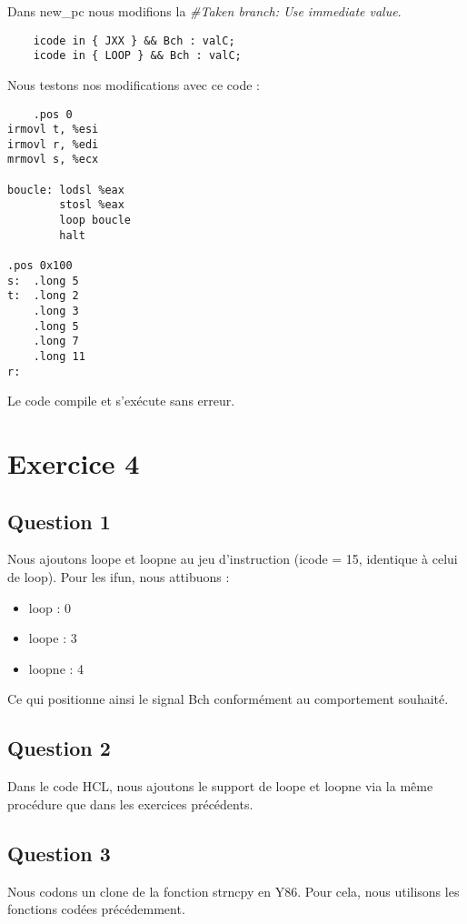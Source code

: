 \documentclass[a4paper,10pt]{article}
\begin{document}
Dans new\_pc nous modifions la \textit{\#Taken branch: Use immediate value}.

\begin{verbatim}
    icode in { JXX } && Bch : valC;
    icode in { LOOP } && Bch : valC;
\end{verbatim}

Nous testons nos modifications avec ce code :

\begin{verbatim}
    .pos 0
irmovl t, %esi
irmovl r, %edi
mrmovl s, %ecx

boucle: lodsl %eax
        stosl %eax
        loop boucle
        halt

.pos 0x100
s:  .long 5
t:  .long 2
    .long 3
    .long 5
    .long 7
    .long 11
r:

\end{verbatim}
Le code compile et s'exécute sans erreur.

\section{Exercice 4}
\subsection{Question 1}
Nous ajoutons loope et loopne au jeu d'instruction (icode = 15, identique à celui de loop).
Pour les ifun, nous attibuons :
\begin{itemize}
    \item loop : 0
    \item loope : 3
    \item loopne : 4
\end{itemize}
Ce qui positionne ainsi le signal Bch conformément au comportement souhaité.

\subsection{Question 2}
Dans le code HCL, nous ajoutons le support de loope et loopne via la même procédure que dans les exercices précédents.

\subsection{Question 3}
Nous codons un clone de la fonction strncpy en Y86.
Pour cela, nous utilisons les fonctions codées précédemment.
\end{document}
